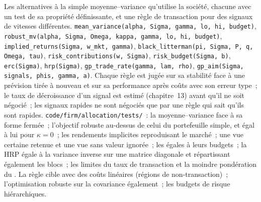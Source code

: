 \begin{build}
 Les alternatives à la simple moyenne--variance qu'utilise la société, chacune avec un test de sa propriété définissante, et une règle de transaction pour des signaux de
vitesses différentes.
 \texttt{mean\_variance(alpha, Sigma, gamma, lo, hi, budget)}, \texttt{robust\_mv(alpha, Sigma, Omega, kappa, gamma, lo, hi, budget)},
\texttt{implied\_returns(Sigma, w\_mkt, gamma)}, \texttt{black\_litterman(pi, Sigma, P, q, Omega, tau)}, \texttt{risk\_contributions(w, Sigma)},
\texttt{risk\_budget(Sigma, b)}, \texttt{erc(Sigma)}, \texttt{hrp(Sigma)}, \texttt{gp\_trade\_rate(gamma, lam, rho)}, \texttt{gp\_aim(Sigma, signals, phis, gamma, a)}.
 Chaque règle est jugée sur sa stabilité face à une prévision tirée à nouveau et sur sa performance après coûts avec son erreur type~; le taux de décroissance d'un signal est
estimé (chapitre~13) avant qu'il ne soit négocié~; les signaux rapides ne sont négociés que par une règle qui sait qu'ils sont rapides.
 \texttt{code/firm/allocation/tests/}~: la moyenne--variance face à sa forme fermée~; l'objectif robuste au-dessus de celui du portefeuille simple, et égal
à lui pour $\kappa = 0$~; les rendements implicites reproduisant le marché~; une vue certaine retenue et une vue sans valeur ignorée~; les  égales à leurs budgets~; la HRP
égale à la variance inverse sur une matrice diagonale et répartissant également les blocs~; les limites du taux de transaction et la moindre pondération du .
 La règle cible avec des coûts linéaires (régions de non-transaction)~; l'optimisation robuste sur la covariance également~; les budgets de risque hiérarchiques.
\end{build}

